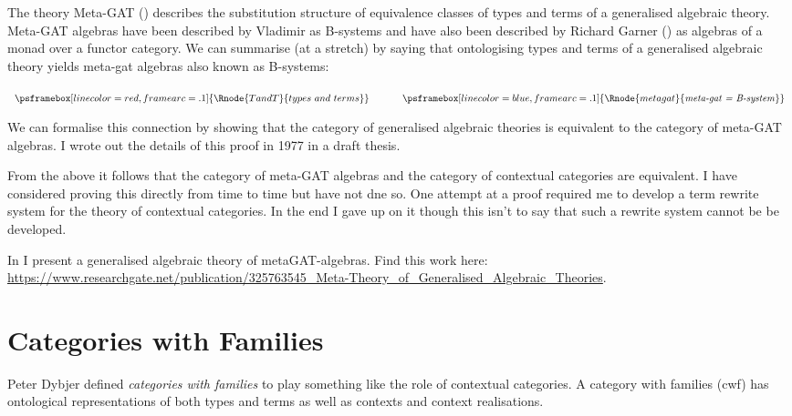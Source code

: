 \documentclass[10pt,a4paper]{article}
\theoremstyle{remark}
\newcommand{\attrtype}[1]{#1}
\renewcommand{\attrtype}[1]{\psframebox[linecolor=blue,framearc=.1]{#1}}
\newcommand{\etype}[1]{#1}
\renewcommand{\etype}[1]{\psframebox[linecolor=red,framearc=.1]{#1}}
\newcommand{\myurl}[1]{{\footnotesize \url{#1}}}
\begin{document}
\note The theory  Meta-GAT  (\cite{CartmellMetaTheory}) describes the substitution structure of equivalence classes of types and terms of a generalised algebraic theory. Meta-GAT algebras have been described by Vladimir as B-systems and have also been described by Richard Garner (\cite{Garner15}) as algebras of a monad over a functor category.  We can summarise (at a stretch) by saying that ontologising types and terms of a generalised algebraic theory yields meta-gat algebras also known as B-systems:

\begin{center}
$
\begin{array}{ c p{0.5cm} c}
\etype{\Rnode{TandT}{types\ and\ terms}} & & \attrtype{\Rnode{metagat}{\mbox{\textit{meta-gat = B-system}}}}
\end{array}                     
$
\setlength{\arrnodesepA}{7pt}
\setlength{\arrnodesepB}{7pt}
\end{center}

\note
We can formalise this connection by showing that the category of generalised algebraic theories 
is equivalent to the category of meta-GAT algebras.  I wrote out the details of this proof in 1977 in a draft thesis. 

\note
From the above it follows that the category of meta-GAT algebras and the category of contextual
categories are equivalent. 
I have considered proving this directly from time to time but have not dne so.
\note
One attempt at a proof required me to develop a  term rewrite system for the theory of contextual categories. In the end I gave up on it though this isn't to say that such a rewrite system cannot be be developed.

\note 
In \cite{CartmellMetaTheory} I present a generalised algebraic theory of metaGAT-algebras.
Find this work here:\\
\myurl{https://www.researchgate.net/publication/325763545_Meta-Theory_of_Generalised_Algebraic_Theories}.

\section{Categories with Families}
\note Peter Dybjer defined \textit{categories with families}  to play something like the role of contextual categories. 
A category with families (cwf) has  ontological representations of both types and terms as well as contexts and context realisations. 
\end{document}
